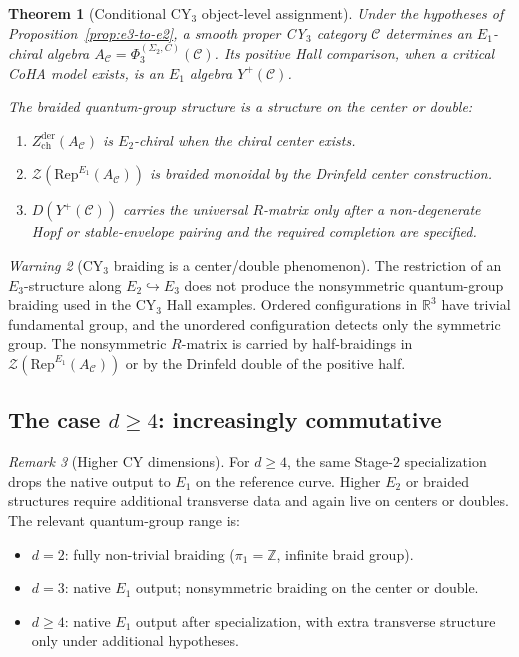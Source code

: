 \documentclass[11pt]{article}
\theoremstyle{plain}
\newtheorem{theorem}{Theorem}[section]
\theoremstyle{definition}
\theoremstyle{remark}
\newtheorem{remark}[theorem]{Remark}
\newtheorem{warning}[theorem]{Warning}
\newcommand{\Eone}{E_1}
\newcommand{\Etwo}{E_2}
\newcommand{\Rep}{\mathrm{Rep}}
\newcommand{\cC}{\mathcal{C}}
\newcommand{\cZ}{\mathcal{Z}}
\begin{document}
\begin{theorem}[Conditional CY$_3$ object-level assignment]
\label{thm:e2-enhancement-d3}
Under the hypotheses of Proposition~\ref{prop:e3-to-e2}, a smooth
proper CY$_3$ category $\cC$ determines an $\Eone$-chiral algebra
$A_\cC=\Phi_3^{(\Sigma_2,C)}(\cC)$. Its positive Hall comparison, when a
critical CoHA model exists, is an $\Eone$ algebra $Y^+(\cC)$.

The braided quantum-group structure is a structure on the center or
double:
\begin{enumerate}[label=(\roman*)]
\item $Z^{\mathrm{der}}_{\mathrm{ch}}(A_\cC)$ is $\Etwo$-chiral when
the chiral center exists.
\item $\cZ(\Rep^{\Eone}(A_\cC))$ is braided monoidal by the Drinfeld
center construction.
\item $D(Y^+(\cC))$ carries the universal $R$-matrix only after a
non-degenerate Hopf or stable-envelope pairing and the required
completion are specified.
\end{enumerate}
\end{theorem}

\begin{warning}[CY$_3$ braiding is a center/double phenomenon]
\label{warn:cy3-symmetric}
The restriction of an $E_3$-structure along $\Etwo \hookrightarrow E_3$
does not produce the nonsymmetric quantum-group braiding used in the
CY$_3$ Hall examples. Ordered configurations in $\mathbb{R}^3$ have
trivial fundamental group, and the unordered configuration detects only
the symmetric group. The nonsymmetric $R$-matrix is carried by
half-braidings in $\cZ(\Rep^{\Eone}(A_\cC))$ or by the Drinfeld double
of the positive half.
\end{warning}

\subsection{The case $d \geq 4$: increasingly commutative}
\label{sec:d-geq-4}

\begin{remark}[Higher CY dimensions]
\label{rem:higher-d}
For $d \geq 4$, the same Stage-$2$ specialization drops the native
output to $\Eone$ on the reference curve. Higher $\Etwo$ or braided
structures require additional transverse data and again live on
centers or doubles. The relevant quantum-group range is:
\begin{itemize}
\item $d = 2$: fully non-trivial braiding ($\pi_1 = \mathbb{Z}$, infinite braid group).
\item $d = 3$: native $\Eone$ output; nonsymmetric braiding on the center or double.
\item $d \geq 4$: native $\Eone$ output after specialization, with extra
transverse structure only under additional hypotheses.
\end{itemize}
\end{remark}
\end{document}
